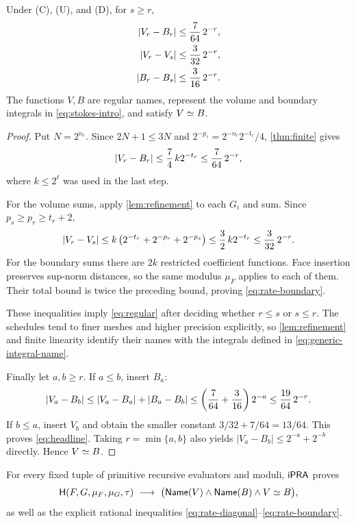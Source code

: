 \begin{theorem}\label{thm:rates}
Under (C), (U), and (D), for $s\ge r$,
\begin{align}
 \left|V_r-B_r\right|&\le\frac7{64}\,2^{-r},\label{eq:rate-diagonal}\\
 \left|V_r-V_s\right|&\le\frac3{32}\,2^{-r},\label{eq:rate-volume}\\
 \left|B_r-B_s\right|&\le\frac3{16}\,2^{-r}.\label{eq:rate-boundary}
\end{align}
The functions $V,B$ are regular names, represent the volume and boundary
integrals in \eqref{eq:stokes-intro}, and satisfy $V\mathrel{\simeq} B$.
\end{theorem}
\begin{proof}
Put $N=2^{n_r}$. Since $2N+1\le3N$ and
$2^{-p_r}=2^{-n_r}2^{-t_r}/4$, \cref{thm:finite} gives
\[
 \left|V_r-B_r\right|
 \le \frac74\,k2^{-t_r}
 \le\frac7{64}\,2^{-r},
\]
where $k\le2^\ell$ was used in the last step.

For the volume sums, apply \cref{lem:refinement} to each $G_i$ and sum.
Since $p_s\ge p_r\ge t_r+2$,
\[
 \left|V_r-V_s\right|
 \le k\left(2^{-t_r}+2^{-p_r}+2^{-p_s}\right)
 \le\frac32\,k2^{-t_r}
 \le\frac3{32}\,2^{-r}.
\]
For the boundary sums there are $2k$ restricted coefficient functions.
Face insertion preserves sup-norm distances, so the same modulus
$\mu_F$ applies to each of them. Their total bound is twice the preceding
bound, proving \eqref{eq:rate-boundary}.

These inequalities imply \eqref{eq:regular} after deciding whether $r\le s$
or $s\le r$. The schedules tend to finer meshes and higher precision
explicitly, so \cref{lem:refinement} and finite linearity identify their
names with the integrals defined in \eqref{eq:generic-integral-name}.

Finally let $a,b\ge r$. If $a\le b$, insert $B_a$:
\[
 \left|V_a-B_b\right|
 \le\left|V_a-B_a\right|+\left|B_a-B_b\right|
 \le\left(\frac7{64}+\frac3{16}\right)2^{-a}
 \le\frac{19}{64}\,2^{-r}.
\]
If $b\le a$, insert $V_b$ and obtain the smaller constant
$3/32+7/64=13/64$. This proves \eqref{eq:headline}.
Taking $r=\min\{a,b\}$ also yields
$|V_a-B_b|\le2^{-a}+2^{-b}$ directly. Hence $V\mathrel{\simeq} B$.
\end{proof}

\begin{corollary}\label{cor:arith-stokes}
For every fixed tuple of primitive recursive evaluators and moduli,
$\mathsf{iPRA}$ proves
\[
 \mathsf H(F,G,\mu_F,\mu_G,\tau)\ \longrightarrow\
 \bigl(\mathsf{Name}(V)\wedge\mathsf{Name}(B)\wedge V\mathrel{\simeq} B\bigr),
\]
as well as the explicit rational inequalities
\eqref{eq:rate-diagonal}--\eqref{eq:rate-boundary}.
\end{corollary}


